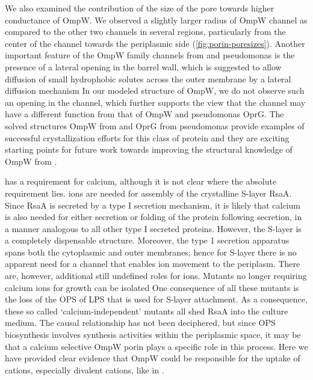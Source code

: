 We also examined the contribution of the size of the pore towards higher conductance of \caulobacter OmpW. We observed a slightly larger radius of \caulobacter OmpW channel as compared to the other two channels in several regions, particularly from the center of the channel towards the periplasmic side (\cref{fig:porin-poresizes}). Another important feature of the OmpW family channels from \ecoli and \ac{pseudomonas} is the presence of a lateral opening in the barrel wall, which is suggested to allow diffusion of small hydrophobic solutes across the outer membrane by a lateral diffusion mechanism In our modeled structure of \caulobacter OmpW, we do not observe such an opening in the channel, which further supports the view that the \caulobacter channel may have a different function from that of \ecoli OmpW and \ac{pseudomonas} OprG. The solved structures OmpW from \ecoli and OprG from \ac{pseudomonas} provide examples of  successful crystallization efforts for this class of protein and they are exciting starting points for future work towards improving the structural knowledge of OmpW from \caulobacter.

\caulobacter has a requirement for calcium, although it is not clear where the absolute requirement lies.  ions are needed for assembly of the crystalline \ac{S-layer} RsaA. Since RsaA is secreted by a type I secretion mechanism, it is likely that calcium is also needed for either secretion or folding of the protein following secretion, in a manner analogous to all other type I secreted proteins.  However, the \ac{S-layer} is a completely dispensable structure. Moreover, the type 1 secretion apparatus spans both the cytoplasmic and outer membranes; hence for \ac{S-layer} there is no apparent need for a channel that enables  ion movement to the periplasm. There are, however, additional still undefined roles for  ions. Mutants no longer requiring calcium ions for growth can be isolated One consequence of all these mutants is the loss of the \ac{OPS} of \ac{LPS} that is used for \ac{S-layer} attachment. As a consequence, these so called `calcium-independent' mutants all shed RsaA into the culture medium. The causal relationship has not been deciphered, but since \ac{OPS} biosynthesis involves synthesis activities within the periplasmic space, it may be that a calcium selective OmpW porin plays a specific role in this process. Here we have provided clear evidence that OmpW could be responsible for the uptake of cations, especially divalent cations, like  in \caulobacter. 
